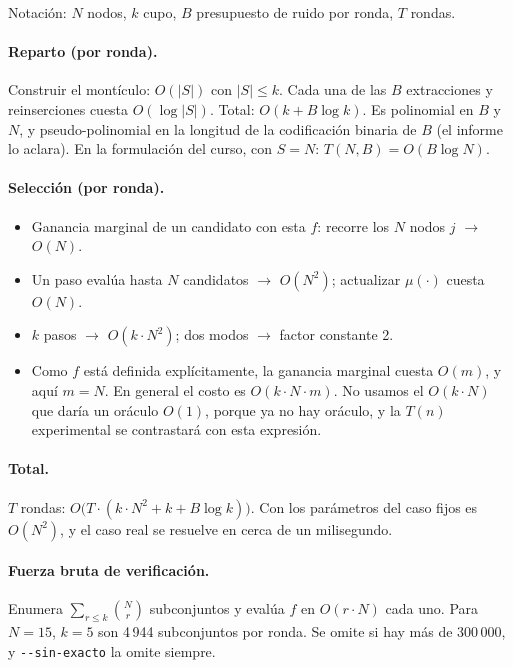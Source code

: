 \documentclass[11pt,a4paper]{article}
\begin{document}
Notación: $N$ nodos, $k$ cupo, $B$ presupuesto de ruido por ronda, $T$ rondas.

\paragraph{Reparto (por ronda).} Construir el montículo: $O(|S|)$ con
$|S|\le k$. Cada una de las $B$ extracciones y reinserciones cuesta
$O(\log|S|)$. Total: $O(k+B\log k)$. Es polinomial en $B$ y $N$, y
pseudo-polinomial en la longitud de la codificación binaria de $B$ (el informe
lo aclara). En la formulación del curso, con $S=N$: $T(N,B)=O(B\log N)$.

\paragraph{Selección (por ronda).}

\begin{itemize}[leftmargin=*,label=$\bullet$]
  \item Ganancia marginal de un candidato con esta $f$: recorre los $N$ nodos
  $j$ $\to$ $O(N)$.
  \item Un paso evalúa hasta $N$ candidatos $\to$ $O(N^2)$; actualizar
  $\mu(\cdot)$ cuesta $O(N)$.
  \item $k$ pasos $\to$ $O(k\cdot N^2)$; dos modos $\to$ factor constante 2.
  \item Como $f$ está definida explícitamente, la ganancia marginal cuesta
  $O(m)$, y aquí $m=N$. En general el costo es $O(k\cdot N\cdot m)$. No usamos
  el $O(k\cdot N)$ que daría un oráculo $O(1)$, porque ya no hay oráculo, y la
  $T(n)$ experimental se contrastará con esta expresión.
\end{itemize}

\paragraph{Total.} $T$ rondas:
$O\bigl(T\cdot(k\cdot N^2+k+B\log k)\bigr)$. Con los parámetros del caso fijos
es $O(N^2)$, y el caso real se resuelve en cerca de un milisegundo.

\paragraph{Fuerza bruta de verificación.} Enumera
$\sum_{r\le k}\binom{N}{r}$ subconjuntos y evalúa $f$ en $O(r\cdot N)$ cada
uno. Para $N=15$, $k=5$ son 4\,944 subconjuntos por ronda. Se omite si hay más
de 300\,000, y \texttt{-{}-sin-exacto} la omite siempre.
\end{document}
